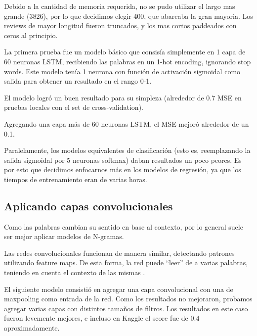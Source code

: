 Debido a la cantidad de memoria requerida, no se pudo utilizar el largo mas grande (3826), por lo
que decidimos elegir 400, que abarcaba la gran mayoria. Los reviews de mayor longitud fueron
truncados, y los mas cortos paddeados con ceros al principio.

La primera prueba fue un modelo b\'asico que consis\'ia simplemente en 1 capa de 60 neuronas LSTM,
recibiendo las palabras en un 1-hot encoding, ignorando stop words. Este modelo ten\'ia 1 neurona
con funci\'on de activaci\'on sigmoidal como salida para obtener un resultado en el rango 0-1.

El modelo logr\'o un buen resultado para su simpleza (alrededor de 0.7 MSE en pruebas locales con el
set de cross-validation).

Agregando una capa m\'as de 60 neuronas LSTM, el MSE mejor\'o alrededor de un 0.1.

Paralelamente, los modelos equivalentes de clasificaci\'on (esto es, reemplazando la salida
sigmoidal por 5 neuronas softmax) daban resultados un poco peores. Es por esto que decidimos
enfocarnos m\'as en los modelos de regresi\'on, ya que los tiempos de entrenamiento eran de varias
horas.


\subsection{Aplicando capas convolucionales}

Como las palabras cambian su sentido en base al contexto, por lo general suele ser mejor aplicar
modelos de N-gramas.

Las redes convolucionales funcionan de manera similar, detectando patrones utilizando feature maps.
De esta forma, la red puede ``leer'' de a varias palabras, teniendo en cuenta el contexto de las
mismas \cite{text_classification_using_CNN}.

El siguiente modelo consisti\'o en agregar una capa convolucional con una de maxpooling como entrada
de la red. Como los resultados no mejoraron, probamos agregar varias capas con distintos tama\~nos
de filtros. Los resultados en este caso fueron levemente mejores, e incluso en Kaggle el score fue
de 0.4 aproximadamente.


